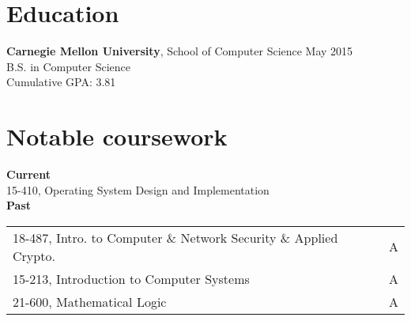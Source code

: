 \documentclass[margin]{res}
\begin{document}

\address{
  5032 Forbes Avenue SMC 6899 \\
  Pittsburgh, PA 15289-6899 \\
  (302) 468-7537
}
\address{  %
  \hfill \href{mailto:joshz@joshz.org}{joshz@joshz.org} \\
  \hfill
    \href{https://github.com/joshzimmerman}{https://github.com/joshzimmerman} \\
  \hfill \href{http://joshz.org}{http://joshz.org}
}

\begin{resume}

\section{Education}
  \textbf{Carnegie Mellon University}, School of Computer Science
    \hfill May 2015\\
  B.S. in Computer Science\\
  Cumulative GPA: 3.81

\section{Notable coursework}
  \textbf{Current}\\
  \hphantom{ } 15-410, Operating System Design and Implementation\\
  \textbf{Past}\vspace{0.25em}\\
  \begin{tabular}{ll}
    18-487, Intro. to Computer \& Network Security \& Applied Crypto. & A\\
                             15-213, Introduction to Computer Systems & A\\
                                           21-600, Mathematical Logic & A
  \end{tabular}


\end{resume}
\end{document}
